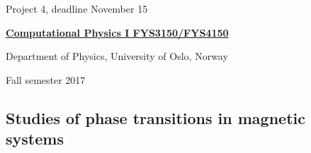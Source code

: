 \documentclass[%
oneside,                 %
final,                   %
10pt]{article}
\begin{document}

\newcommand{\exercisesection}[1]{\subsection*{#1}}






\thispagestyle{empty}

\begin{center}
{\LARGE\bf
\begin{spacing}{1.25}
Project 4, deadline  November 15
\end{spacing}
}
\end{center}


\begin{center}
{\bf \href{{http://www.uio.no/studier/emner/matnat/fys/FYS3150/index-eng.html}}{Computational Physics I FYS3150/FYS4150}}
\end{center}

    \begin{center}
\centerline{{\small Department of Physics, University of Oslo, Norway}}
\end{center}
    

\begin{center}
Fall semester 2017
\end{center}

\vspace{1cm}


\subsection{Studies of phase transitions in magnetic systems}
\end{document}
